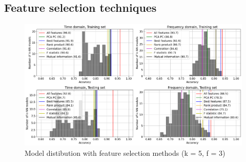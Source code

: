 \subsection{Feature selection techniques}
\begin{figure}[h]
    \centering
    \includegraphics[width=\textwidth]{assets/results/feature-combinations/model-distr-fsel-k5-f3.png}
    \caption{Model distibution with feature selection methods (k = 5, f = 3)}
\end{figure}

